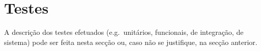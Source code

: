 \section{Testes} %
\label{sec:testes}

A descrição dos testes efetuados (e.g.\ unitários, funcionais, de integração, de sistema) pode ser feita nesta secção ou, caso não se justifique, na secção anterior.

